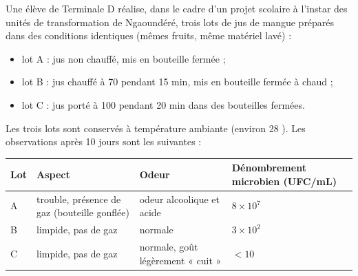 \documentclass[11pt]{article}
\begin{document}
\begin{exercice}
Une élève de Terminale D réalise, dans le cadre d'un projet scolaire à l'instar des unités de transformation de Ngaoundéré, trois lots de jus de mangue préparés dans des conditions identiques (mêmes fruits, même matériel lavé) :
\begin{itemize}
\item lot A : jus non chauffé, mis en bouteille fermée ;
\item lot B : jus chauffé à 70 \textcelsius{} pendant 15 min, mis en bouteille fermée à chaud ;
\item lot C : jus porté à 100 \textcelsius{} pendant 20 min dans des bouteilles fermées.
\end{itemize}
Les trois lots sont conservés à température ambiante (environ 28 \textcelsius). Les observations après 10 jours sont les suivantes :

\begin{center}
\begin{tabularx}{\linewidth}{|l|X|X|X|}\hline
\rowcolor{popblueL} Lot & Aspect & Odeur & Dénombrement microbien (UFC/mL) \\ \hline
A & trouble, présence de gaz (bouteille gonflée) & odeur alcoolique et acide & $8 \times 10^{7}$ \\ \hline
B & limpide, pas de gaz & normale & $3 \times 10^{2}$ \\ \hline
C & limpide, pas de gaz & normale, goût légèrement « cuit » & $< 10$ \\ \hline
\end{tabularx}
\end{center}


\end{exercice}
\end{document}
